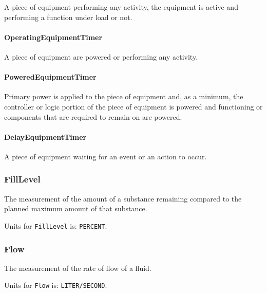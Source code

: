 A piece of equipment performing any activity, the equipment is active and performing a function under load or not.


\paragraph{OperatingEquipmentTimer}\mbox{}
\label{sec:OperatingEquipmentTimer}



A piece of equipment are powered or performing any activity.


\paragraph{PoweredEquipmentTimer}\mbox{}
\label{sec:PoweredEquipmentTimer}



Primary  power is  applied  to the  piece  of  equipment and,  as  a minimum, the controller or logic portion of the piece of equipment is powered and functioning or components that are required to remain on are powered.


\paragraph{DelayEquipmentTimer}\mbox{}
\label{sec:DelayEquipmentTimer}



A piece of equipment waiting for an event or an action to occur.


\subsubsection{FillLevel}
\label{sec:FillLevel}



The measurement of the amount of a substance remaining compared to the planned maximum amount of that substance.


Units for \texttt{FillLevel} is: \texttt{PERCENT}.

\FloatBarrier

\subsubsection{Flow}
\label{sec:Flow}



The measurement of the rate of flow of a fluid.


Units for \texttt{Flow} is: \texttt{LITER/SECOND}.

